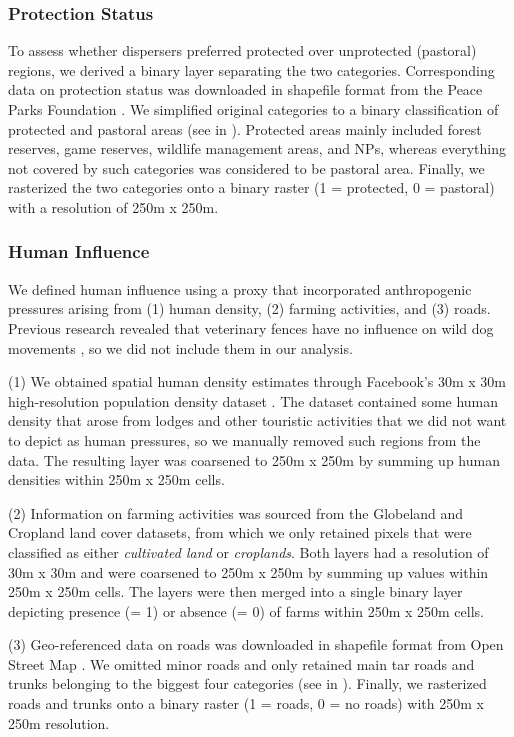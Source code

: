 \documentclass[abstract=on,10pt,a4paper,bibliography=totocnumbered]{scrartcl}
\begin{document}
\subsubsection{Protection Status}
To assess whether dispersers preferred protected over unprotected (pastoral)
regions, we derived a binary layer separating the two categories. Corresponding
data on protection status was downloaded in shapefile format from the Peace
Parks Foundation \citep{PeaceParks.2019}. We simplified original categories to a
binary classification of protected and pastoral areas (see
 in ). Protected areas
mainly included forest reserves, game reserves, wildlife management areas, and
NPs, whereas everything not covered by such categories was considered to be
pastoral area. Finally, we rasterized the two categories onto a binary raster (1
= protected, 0 = pastoral) with a resolution of 250m x 250m.

\subsubsection{Human Influence}
We defined human influence using a proxy that incorporated anthropogenic
pressures arising from (1) human density, (2) farming activities, and (3) roads.
Previous research revealed that veterinary fences have no influence on wild dog
movements \citep{Cozzi.2013b}, so we did not include them in our analysis.

(1) We obtained spatial human density estimates through Facebook's 30m x 30m
high-resolution population density dataset \citep{Facebook.2019}. The dataset
contained some human density that arose from lodges and other touristic
activities that we did not want to depict as human pressures, so we manually
removed such regions from the data. The resulting layer was coarsened to 250m x
250m by summing up human densities within 250m x 250m cells.

(2) Information on farming activities was sourced from the Globeland
\citep{Chen.2015} and Cropland \citep{Xiong.2017} land cover datasets, from
which we only retained pixels that were classified as either \textit{cultivated
land} or \textit{croplands}. Both layers had a resolution of 30m x 30m and were
coarsened to 250m x 250m by summing up values within 250m x 250m cells. The
layers were then merged into a single binary layer depicting presence (= 1) or
absence (= 0) of farms within 250m x 250m cells.

(3) Geo-referenced data on roads was downloaded in shapefile format from Open
Street Map \citep{OpenStreetMap.2019}. We omitted minor roads and only retained
main tar roads and trunks belonging to the biggest four categories (see
 in ). Finally, we
rasterized roads and trunks onto a binary raster (1 = roads, 0 = no roads) with
250m x 250m resolution.
\end{document}
